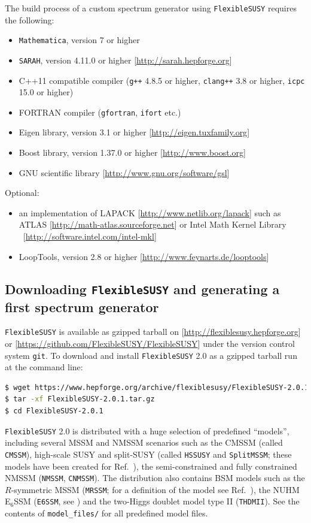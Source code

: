 \documentclass[final,3p,11pt,pdflatex]{elsarticle}
\makeatletter
\newcommand{\modelname}[1]{\texttt{#1}\@\xspace}
\newcommand{\sarah}{\texttt{SARAH}\@\xspace}
\newcommand{\fs}{\texttt{FlexibleSUSY}\@\xspace}
\newcommand{\HSSUSY}{\modelname{HSSUSY}}
\newcommand{\fstwo}{\fs 2.0\@\xspace}
\newcommand{\mathematica}{\texttt{Ma\-the\-ma\-ti\-ca}\xspace}
\newcommand{\ESSM}{E$_6$SSM\@\xspace}
\newcommand{\code}[1]{\lstinline|#1|}  %
\makeatother
\begin{document}
The build process of a custom spectrum generator using \fs requires
the following:
%
\begin{itemize}
\item \mathematica, version 7 or higher
\item \sarah, version 4.11.0 or higher [\url{http://sarah.hepforge.org}]
\item C++11 compatible compiler (\texttt{g++} 4.8.5 or higher,
  \texttt{clang++} 3.8 or higher, \texttt{icpc} 15.0 or higher)
\item FORTRAN compiler (\texttt{gfortran}, \texttt{ifort} etc.)
\item Eigen library, version 3.1 or higher
  [\url{http://eigen.tuxfamily.org}]
\item Boost library, version 1.37.0 or higher
  [\url{http://www.boost.org}]
\item GNU scientific library [\url{http://www.gnu.org/software/gsl}]
\end{itemize}
%
Optional:
%
\begin{itemize}
\item an implementation of LAPACK [\url{http://www.netlib.org/lapack}]
  such as ATLAS [\url{http://math-atlas.sourceforge.net}] or
  Intel Math Kernel Library\\\ [\url{http://software.intel.com/intel-mkl}]
\item LoopTools, version 2.8 or higher
  [\url{http://www.feynarts.de/looptools}]
\end{itemize}

\subsection{Downloading \fs and generating a first spectrum generator}
\label{sec:quick-start-cmssm}
\fs is available as gzipped tarball on
[\url{http://flexiblesusy.hepforge.org}] or
[\url{https://github.com/FlexibleSUSY/FlexibleSUSY}] under the version
control system \texttt{git}.
%
To download and install \fstwo as a gzipped tarball run at the command
line:
%
\begin{lstlisting}[language=bash]
$ wget https://www.hepforge.org/archive/flexiblesusy/FlexibleSUSY-2.0.1.tar.gz
$ tar -xf FlexibleSUSY-2.0.1.tar.gz
$ cd FlexibleSUSY-2.0.1
\end{lstlisting}%
%
\fstwo is distributed with a huge selection of predefined ``models'', 
including several MSSM and NMSSM scenarios such as the CMSSM (called
\modelname{CMSSM}), high-scale SUSY and split-SUSY (called \HSSUSY and
\modelname{SplitMSSM}; these  models have been created for
Ref.~\cite{Bagnaschi:2015pwa}), the semi-constrained and
fully constrained NMSSM (\modelname{NMSSM}, \modelname{CNMSSM}). The
distribution also contains BSM models such as the
$R$-symmetric MSSM (\modelname{MRSSM}; for a definition of the model
see Ref.~\cite{Kribs:2007ac}), the NUHM \ESSM
(\modelname{E6SSM}, see \cite{King:2005jy,King:2005my,Athron:2010zz,
  Athron:2009ue,Athron:2009bs,Athron:2007en}) and the two-Higgs 
doublet model type II
(\modelname{THDMII}).  See the 
contents of \code{model_files/} for all predefined model files.
\end{document}
